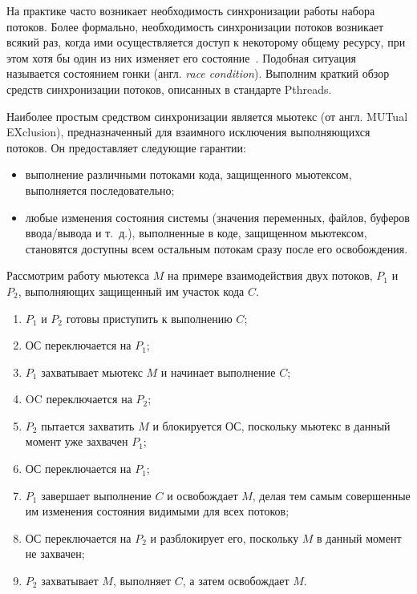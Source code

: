 На практике часто возникает необходимость синхронизации работы набора потоков.
Более формально, необходимость синхронизации потоков возникает всякий раз,
когда ими осуществляется доступ к некоторому общему ресурсу,
при этом хотя бы один из них изменяет его состояние~\cite{Tanenbaum:2007:MOS:1410217}.
Подобная ситуация называется состоянием гонки (англ. \textit{race condition}).
Выполним краткий обзор средств синхронизации потоков, описанных в стандарте Pthreads.

Наиболее простым средством синхронизации является мьютекс (от англ. MUTual EXclusion),
предназначенный для взаимного исключения выполняющихся потоков.
Он предоставляет следующие гарантии:
\begin{itemize}
  \item выполнение различными потоками кода, защищенного мьютексом,
    выполняется последовательно;
  \item любые изменения состояния системы (значения переменных, файлов,
    буферов ввода/вывода и т.~д.),
    выполненные в коде, защищенном мьютексом, становятся доступны всем
    остальным потокам сразу после его освобождения.
\end{itemize}

Рассмотрим работу мьютекса \( M \) на примере взаимодействия двух потоков,
\( P_1 \) и \( P_2 \), выполняющих защищенный им участок кода \( C \).
\begin{enumerate}
\item \( P_1 \) и \( P_2 \) готовы приступить к выполнению \( C \);
\item ОС переключается на \( P_1 \);
\item \( P_1 \) захватывает мьютекс \( M \) и начинает выполнение \( C \);
\item OC переключается на \( P_2 \);
\item \( P_2 \) пытается захватить \( M \) и блокируется ОС,
  поскольку мьютекс в данный момент уже захвачен \( P_1 \);
\item ОС переключается на \( P_1 \);
\item \( P_1 \) завершает выполнение \( C \) и освобождает \( M \),
  делая тем самым совершенные им изменения состояния видимыми для всех потоков;
\item ОС переключается на \( P_2 \) и разблокирует его, поскольку \( M \)
  в данный момент не захвачен;
\item \( P_2 \) захватывает \( M \), выполняет \( C \), а затем освобождает \( M \).
\end{enumerate}


